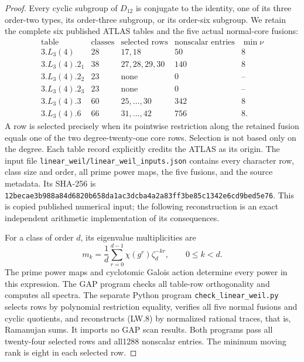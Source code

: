 \begin{proof}
Every cyclic subgroup of $D_{12}$ is conjugate to the identity,
one of its three order-two types, its order-three subgroup, or its
order-six subgroup. We retain the complete six published ATLAS
tables and the five actual normal-core fusions:
\[
\begin{array}{c|r|l|r|r}
\text{table}&\text{classes}&\text{selected rows}&
       \text{nonscalar entries}&\min\nu\\ \hline
3.L_3(4)&28&17,18&50&8\\
3.L_3(4).2_1&38&27,28,29,30&140&8\\
3.L_3(4).2_2&23&\text{none}&0&\text{--}\\
3.L_3(4).2_3&23&\text{none}&0&\text{--}\\
3.L_3(4).3&60&25,\ldots,30&342&8\\
3.L_3(4).6&66&31,\ldots,42&756&8.
\end{array}                                                   \tag{LW.7}
\]
A row is selected precisely when its pointwise restriction along
the retained fusion equals one of the two degree-twenty-one core
rows. Selection is not based only on the degree. Each table record
explicitly credits the ATLAS as its origin. The input file
\texttt{linear\_weil/linear\_weil\_inputs.json} contains every
character row, class size and order, all prime power maps, the
five fusions, and the source metadata. Its SHA-256 is
\texttt{12becae3b988a84d6820b658da1ac3dcba4a2a83ff3be85c1342e6cd9bed5e76}.
This is copied published numerical input; the following reconstruction
is an exact independent arithmetic implementation of its consequences.

For a class of order $d$, its eigenvalue multiplicities are
\[
 m_k=\frac1d\sum_{r=0}^{d-1}\chi(g^r)\zeta_d^{-kr},
                  \qquad0\le k<d.                           \tag{LW.8}
\]
The prime power maps and cyclotomic Galois action determine every
power in this expression. The GAP program checks all table-row
orthogonality and computes all spectra. The separate Python program
\texttt{check\_linear\_weil.py} selects rows by polynomial
restriction equality, verifies all five normal fusions and cyclic
quotients, and reconstructs (LW.8) by normalized rational traces,
that is, Ramanujan sums. It imports no GAP scan results. Both
programs pass all twenty-four selected rows and all1288 nonscalar
entries. The minimum moving rank is eight in each selected row.


\end{proof}
